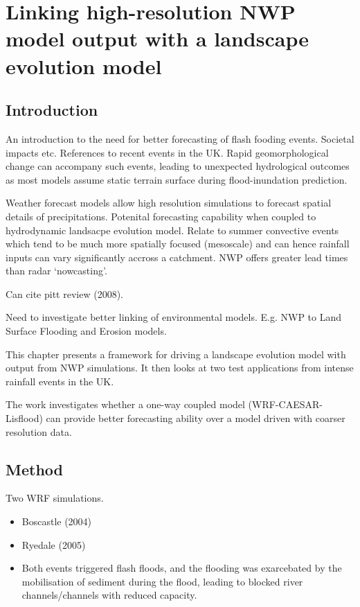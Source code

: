 \chapter{Linking high-resolution NWP model output with a landscape evolution model}

\section{Introduction}

An introduction to the need for better forecasting of flash fooding events. Societal impacts etc. References to recent events in the UK. Rapid geomorphological change can accompany such events, leading to unexpected hydrological outcomes as most models assume static terrain surface during flood-inundation prediction.

Weather forecast models allow high resolution simulations to forecast spatial details of precipitations. Potenital forecasting capability when coupled to hydrodynamic landsacpe evolution model. Relate to summer convective events which tend to be much more spatially focused (mesoscale) and can hence rainfall inputs can vary significantly accross a catchment. NWP offers greater lead times than radar `nowcasting'. 

Can cite pitt review (2008).

Need to investigate better linking of environmental models. E.g. NWP to Land Surface Flooding and Erosion models.

This chapter presents a framework for driving a landscape evolution model with output from NWP simulations. It then looks at two test applications from intense rainfall events in the UK. 

The work investigates whether a one-way coupled model (WRF-CAESAR-Lisflood) can provide better forecasting ability over a model driven with coarser resolution data.

\section{Method}

Two WRF simulations.

\begin{itemize}
\item Boscastle (2004)
\item Ryedale (2005)
\item Both events triggered flash floods, and the flooding was exarcebated by the mobilisation of sediment during the flood, leading to blocked river channels/channels with reduced capacity.
\end{itemize}

